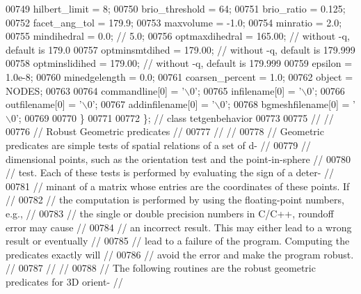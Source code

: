 \begin{DoxyCode}
00749     hilbert\_limit = 8;
00750     brio\_threshold = 64;
00751     brio\_ratio = 0.125;
00752     facet\_ang\_tol = 179.9;
00753     maxvolume = -1.0;
00754     minratio = 2.0;
00755     mindihedral = 0.0; \textcolor{comment}{// 5.0; }
00756     optmaxdihedral = 165.00; \textcolor{comment}{// without -q, default is 179.0}
00757     optminsmtdihed = 179.00; \textcolor{comment}{// without -q, default is 179.999}
00758     optminslidihed = 179.00; \textcolor{comment}{// without -q, default is 179.999}
00759     epsilon = 1.0e-8;
00760     minedgelength = 0.0;
00761     coarsen\_percent = 1.0;
00762     \textcolor{keywordtype}{object} = NODES;
00763 
00764     commandline[0] = \textcolor{charliteral}{'\(\backslash\)0'};
00765     infilename[0] = \textcolor{charliteral}{'\(\backslash\)0'};
00766     outfilename[0] = \textcolor{charliteral}{'\(\backslash\)0'};
00767     addinfilename[0] = \textcolor{charliteral}{'\(\backslash\)0'};
00768     bgmeshfilename[0] = \textcolor{charliteral}{'\(\backslash\)0'};
00769 
00770   \}
00771 
00772 \}; \textcolor{comment}{// class tetgenbehavior}
00773 
00775 \textcolor{comment}{//                                                                           //}
00776 \textcolor{comment}{// Robust Geometric predicates                                               //}
00777 \textcolor{comment}{//                                                                           //}
00778 \textcolor{comment}{// Geometric predicates are simple tests of spatial relations of a set of d- //}
00779 \textcolor{comment}{// dimensional points, such as the orientation test and the point-in-sphere  //}
00780 \textcolor{comment}{// test. Each of these tests is performed by evaluating the sign of a deter- //}
00781 \textcolor{comment}{// minant of a matrix whose entries are the coordinates of these points.  If //}
00782 \textcolor{comment}{// the computation is performed by using the floating-point numbers, e.g.,   //}
00783 \textcolor{comment}{// the single or double precision numbers in C/C++, roundoff error may cause //}
00784 \textcolor{comment}{// an incorrect result. This may either lead to a wrong result or eventually //}
00785 \textcolor{comment}{// lead to a failure of the program.  Computing the predicates exactly will  //}
00786 \textcolor{comment}{// avoid the error and make the program robust.                              //}
00787 \textcolor{comment}{//                                                                           //}
00788 \textcolor{comment}{// The following routines are the robust geometric predicates for 3D orient- //}

\end{DoxyCode}

